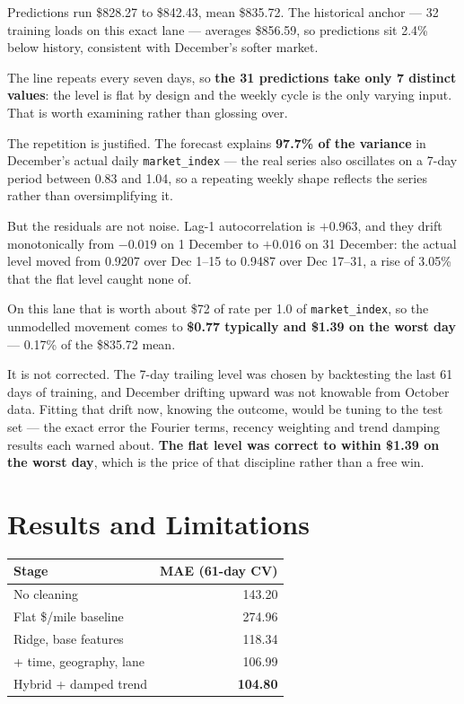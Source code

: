 \documentclass[11pt,a4paper]{article}
\newcommand{\key}[1]{\textbf{\color{spotter}#1}}
\begin{document}
Predictions run \$828.27 to \$842.43, mean \$835.72. The historical anchor --- 32
training loads on this exact lane --- averages \$856.59, so predictions sit 2.4\%
below history, consistent with December's softer market.

The line repeats every seven days, so \key{the 31 predictions take only 7 distinct
values}: the level is flat by design and the weekly cycle is the only varying
input. That is worth examining rather than glossing over.

The repetition is justified. The forecast explains \key{97.7\% of the variance} in
December's actual daily \texttt{market\_index} --- the real series also oscillates
on a 7-day period between 0.83 and 1.04, so a repeating weekly shape reflects the
series rather than oversimplifying it.

But the residuals are not noise. Lag-1 autocorrelation is $+0.963$, and they drift
monotonically from $-0.019$ on 1 December to $+0.016$ on 31 December: the actual
level moved from 0.9207 over Dec 1--15 to 0.9487 over Dec 17--31, a rise of 3.05\%
that the flat level caught none of.

On this lane that is worth about \$72 of rate per 1.0 of \texttt{market\_index},
so the unmodelled movement comes to \key{\$0.77 typically and \$1.39 on the worst
day} --- 0.17\% of the \$835.72 mean.

It is not corrected. The 7-day trailing level was chosen by backtesting the last
61 days of training, and December drifting upward was not knowable from October
data. Fitting that drift now, knowing the outcome, would be tuning to the test set
--- the exact error the Fourier terms, recency weighting and trend damping results
each warned about. \key{The flat level was correct to within \$1.39 on the worst
day}, which is the price of that discipline rather than a free win.

\section{Results and Limitations}

\begin{center}
\small
\begin{tabular}{@{}lr@{}}
\toprule
\textbf{Stage} & \textbf{MAE (61-day CV)}\\
\midrule
No cleaning & 143.20\\
Flat \$/mile baseline & 274.96\\
Ridge, base features & 118.34\\
+ time, geography, lane & 106.99\\
Hybrid + damped trend & \key{104.80}\\
\bottomrule
\end{tabular}
\end{center}
\end{document}
